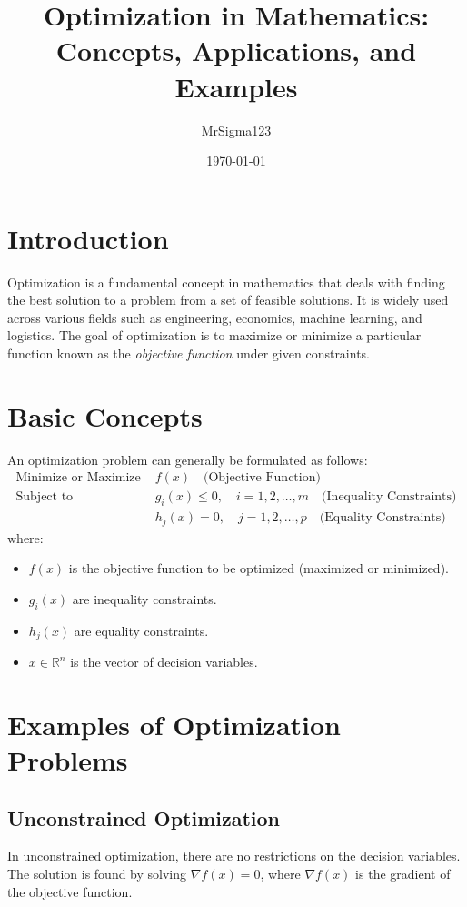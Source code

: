 \documentclass[a4paper,12pt]{article}
\title{Optimization in Mathematics: Concepts, Applications, and Examples}
\author{MrSigma123}
\date{\today}
\begin{document}
\maketitle

\section*{Introduction}
Optimization is a fundamental concept in mathematics that deals with finding the best solution to a problem from a set of feasible solutions. It is widely used across various fields such as engineering, economics, machine learning, and logistics. The goal of optimization is to maximize or minimize a particular function known as the \textit{objective function} under given constraints.

\section{Basic Concepts}
An optimization problem can generally be formulated as follows:
\begin{align*}
\text{Minimize or Maximize } & f(x) \quad \text{(Objective Function)} \\
\text{Subject to } & g_i(x) \leq 0, \quad i = 1, 2, \ldots, m \quad \text{(Inequality Constraints)} \\
& h_j(x) = 0, \quad j = 1, 2, \ldots, p \quad \text{(Equality Constraints)}
\end{align*}
where:
\begin{itemize}
    \item $f(x)$ is the objective function to be optimized (maximized or minimized).
    \item $g_i(x)$ are inequality constraints.
    \item $h_j(x)$ are equality constraints.
    \item $x \in \mathbb{R}^n$ is the vector of decision variables.
\end{itemize}

\section{Examples of Optimization Problems}
\subsection{Unconstrained Optimization}
In unconstrained optimization, there are no restrictions on the decision variables. The solution is found by solving $\nabla f(x) = 0$, where $\nabla f(x)$ is the gradient of the objective function.
\end{document}

